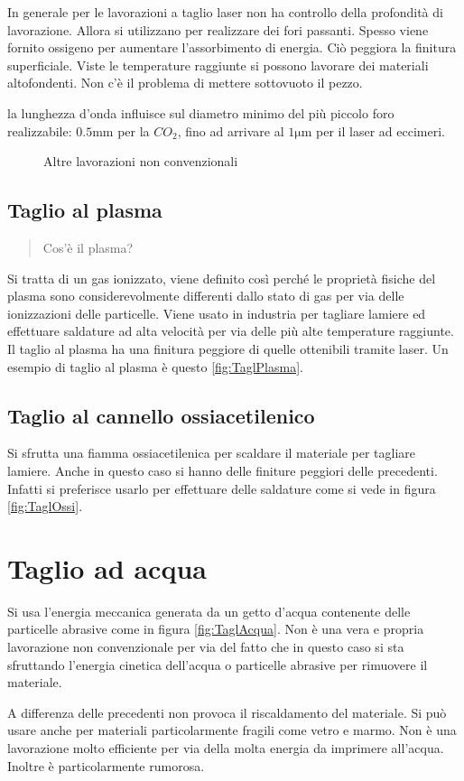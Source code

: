 In generale per le lavorazioni a taglio laser non ha controllo della profondità di lavorazione. Allora si utilizzano per realizzare dei fori passanti.
Spesso viene fornito ossigeno per aumentare l'assorbimento di energia.
Ciò peggiora la finitura superficiale. 
Viste le temperature raggiunte si possono lavorare dei materiali altofondenti. Non c'è il problema di mettere sottovuoto il pezzo.

la lunghezza d'onda influisce sul diametro minimo del più piccolo foro realizzabile:
$0.5\unit{\mm}$ per la $CO_2$, fino ad arrivare al $1\unit{\um}$ per il laser ad eccimeri.

\begin{figure}
\:
\:
\caption{Altre lavorazioni non convenzionali}
\label{fig:AltreNonConv}
\end{figure}

\subsection{Taglio al plasma}
\begin{quote}
Cos'è il plasma?
\end{quote}
Si tratta di un gas ionizzato, viene definito così perché le proprietà fisiche del plasma sono considerevolmente differenti dallo stato di gas per via delle ionizzazioni delle particelle.
Viene usato in industria per tagliare lamiere ed effettuare saldature ad alta velocità per via delle più alte temperature raggiunte.
Il taglio al plasma ha una finitura peggiore di quelle ottenibili tramite laser.
Un esempio di taglio al plasma è questo \ref{fig:TaglPlasma}.

\subsection{Taglio al cannello ossiacetilenico}
Si sfrutta una fiamma ossiacetilenica per scaldare il materiale per tagliare lamiere. Anche in questo caso si hanno delle finiture peggiori delle precedenti. Infatti si preferisce usarlo per effettuare delle saldature come si vede in figura \ref{fig:TaglOssi}.

\section{Taglio ad acqua}
Si usa l'energia meccanica generata da un getto d'acqua contenente delle particelle abrasive come in figura \ref{fig:TaglAcqua}.
Non è una vera e propria lavorazione non convenzionale per via del fatto che in questo caso si sta sfruttando l'energia cinetica dell'acqua o particelle abrasive per rimuovere il materiale.

A differenza delle precedenti non provoca il riscaldamento del materiale.
Si può usare anche per materiali particolarmente fragili come vetro e marmo.
Non è una lavorazione molto efficiente per via della molta energia da imprimere all'acqua. Inoltre è particolarmente rumorosa.


